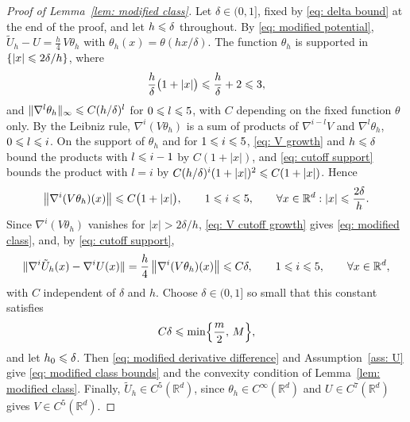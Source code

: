 \begin{proof}[Proof of Lemma~\ref{lem: modified class}]
    Let $\delta \in (0,1]$, fixed by \eqref{eq: delta bound} at the end of the proof, and let $h \leqslant \delta$ throughout. By \eqref{eq: modified potential}, $\tilde U_h - U = \frac h4\, V \theta_h$ with $\theta_h(x) = \theta(hx/\delta)$. The function $\theta_h$ is supported in $\{|x| \leqslant 2\delta/h\}$, where
    \begin{equation}
        \frac h\delta \bigl( 1 + |x| \bigr) \leqslant \frac h\delta + 2 \leqslant 3 ,
        \label{eq: cutoff support}
    \end{equation}
    and $\lVert \nabla^l \theta_h \rVert_\infty \leqslant C (h/\delta)^l$ for $0 \leqslant l \leqslant 5$, with $C$ depending on the fixed function $\theta$ only. By the Leibniz rule, $\nabla^i (V\theta_h)$ is a sum of products of $\nabla^{i-l} V$ and $\nabla^l \theta_h$, $0 \leqslant l \leqslant i$. On the support of $\theta_h$ and for $1 \leqslant i \leqslant 5$, \eqref{eq: V growth} and $h \leqslant \delta$ bound the products with $l \leqslant i - 1$ by $C(1+|x|)$, and \eqref{eq: cutoff support} bounds the product with $l = i$ by $C (h/\delta)^i (1+|x|)^2 \leqslant C(1+|x|)$. Hence
    \begin{equation}
        \bigl\| \nabla^i (V\theta_h)(x) \bigr\| \leqslant C \bigl( 1 + |x| \bigr) , \qquad 1 \leqslant i \leqslant 5 , \qquad \forall x\in \mathbb R^d: |x| \leqslant \frac{2\delta}{h} .
        \label{eq: V cutoff growth}
    \end{equation}
    Since $\nabla^i (V\theta_h)$ vanishes for $|x| > 2\delta/h$, \eqref{eq: V cutoff growth} gives \eqref{eq: modified class}, and, by \eqref{eq: cutoff support},
    \begin{equation}
        \lVert \nabla^i \tilde U_h(x) - \nabla^i U(x) \rVert = \frac h4\, \bigl\| \nabla^i (V\theta_h)(x) \bigr\| \leqslant C \delta , \qquad 1 \leqslant i \leqslant 5 , \qquad \forall x \in \mathbb R^d ,
        \label{eq: modified derivative difference}
    \end{equation}
    with $C$ independent of $\delta$ and $h$. Choose $\delta \in (0,1]$ so small that this constant satisfies
    \begin{equation}
    C\delta \leqslant \min\Bigl\{ \frac m2 ,\, M \Bigr\} ,
    \label{eq: delta bound}
    \end{equation}
    and let $h_0 \leqslant \delta$. Then \eqref{eq: modified derivative difference} and Assumption~\ref{ass: U} give \eqref{eq: modified class bounds} and the convexity condition of Lemma~\ref{lem: modified class}. Finally, $\tilde U_h \in C^5(\mathbb R^d)$, since $\theta_h \in C^\infty(\mathbb R^d)$ and $U \in C^7(\mathbb R^d)$ gives $V \in C^5(\mathbb R^d)$.
\end{proof}

